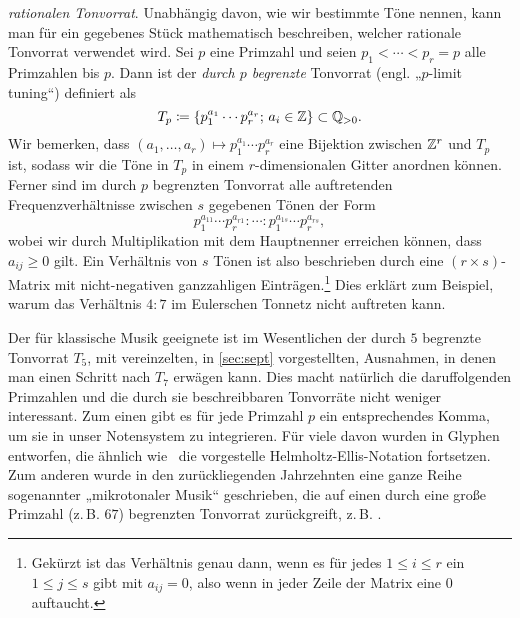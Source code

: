 \emph{rationalen Tonvorrat}.  Unabhängig davon, wie wir bestimmte Töne nennen,
kann man für ein gegebenes Stück mathematisch beschreiben, welcher rationale
Tonvorrat verwendet wird.  Sei $p$ eine Primzahl und seien $p_1<\dotsb<p_r=p$
alle Primzahlen bis $p$. Dann ist der \emph{durch $p$ begrenzte} Tonvorrat
(engl. „$p$-limit tuning“) definiert als
\[T_p\coloneqq\{p_1^{a_1}\dotsm p_r^{a_r};\,a_i\in\mathbb{Z}\}\subset \mathbb{Q}_{>0}.\]%
Wir bemerken, dass $(a_1,\dotsc,a_r)\mapsto p_1^{a_1}\dotsm p_r^{a_r}$ eine
Bijektion zwischen $\mathbb{Z}^r$ und $T_p$ ist, sodass wir die Töne in $T_p$ in einem
$r$-dimensionalen Gitter anordnen können. Ferner sind im durch $p$ begrenzten
Tonvorrat alle auftretenden Frequenzverhältnisse zwischen $s$ gegebenen Tönen
der Form
\[p_1^{a_{11}}\dotsm p_r^{a_{r1}}:\dotsb:p_1^{a_{1s}}\dotsm p_r^{a_{rs}},\]%
wobei wir durch Multiplikation mit dem Hauptnenner erreichen können, dass
$a_{ij}\ge 0$ gilt. Ein Verhältnis von $s$ Tönen ist also beschrieben durch eine
$(r\times s)$-Matrix mit nicht-negativen ganzzahligen
Einträgen.\footnote{Gekürzt ist das Verhältnis genau dann, wenn es für jedes
	$1\le i\le r$ ein $1\le j\le s$ gibt mit $a_{ij}=0$, also wenn in jeder Zeile
	der Matrix eine $0$ auftaucht.} Dies erklärt zum Beispiel, warum das
Verhältnis $4:7$ im Eulerschen Tonnetz nicht auftreten kann.

Der für klassische Musik geeignete ist im Wesentlichen der durch $5$ begrenzte
Tonvorrat $T_5$, mit vereinzelten, in \cref{sec:sept} vorgestellten, Ausnahmen,
in denen man einen Schritt nach $T_7$ erwägen kann.  Dies macht natürlich die
daruffolgenden Primzahlen und die durch sie beschreibbaren Tonvorräte nicht
weniger interessant. Zum einen gibt es für jede Primzahl $p$ ein entsprechendes
Komma, um sie in unser Notensystem zu integrieren. Für viele davon wurden in
\cite{HEJI} Glyphen entworfen, die ähnlich wie \septimal\ die vorgestelle
Helmholtz-Ellis-Notation fortsetzen. Zum anderen wurde in den zurückliegenden
Jahrzehnten eine ganze Reihe sogenannter „mikrotonaler Musik“ geschrieben, die
auf einen durch eine große Primzahl (z.\,B. $67$) begrenzten Tonvorrat
zurückgreift, z.\,B. \cite{Nicholson}.

 
